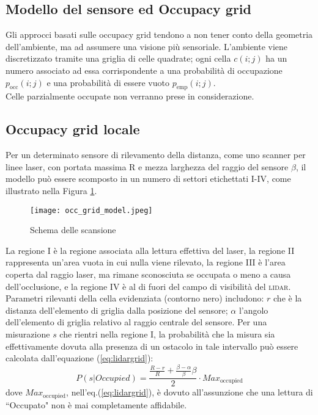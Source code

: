 \subsection{Modello del sensore ed Occupacy grid}

Gli approcci basati sulle occupacy grid tendono a non tener conto della geometria 
dell'ambiente, ma ad assumere una visione più sensoriale.
L'ambiente viene discretizzato tramite una griglia di celle quadrate; ogni 
cella $c(i; j)$ ha un numero associato ad essa corrispondente a una probabilità 
di occupazione $p_{\text{occ}}(i; j)$ e una probabilità di essere 
vuoto $p_{\text{emp}}(i;j)$.\\
Celle parzialmente occupate non verranno prese in considerazione.

\subsection{Occupacy grid locale}
Per un determinato sensore di rilevamento della distanza, come uno scanner per 
linee laser, con portata massima R e mezza larghezza del raggio del sensore
$\beta$, il modello può essere scomposto in un numero di settori etichettati 
I-IV\cite{ardhaoui2011implementation}, come illustrato nella Figura \ref{fig:scan scheme}.
%
\begin{figure}[htb]
  \texttt{[image: occ\_grid\_model.jpeg]}
  \caption{Schema delle scansione}
  \label{fig:scan scheme}
\end{figure}

\noindent La regione I è la regione associata alla lettura effettiva del laser, la
regione II rappresenta un'area vuota in cui nulla viene rilevato, la regione III
è l'area coperta dal raggio laser, ma rimane sconosciuta se occupata o meno a
causa dell'occlusione, e la regione IV è al di fuori del campo di visibilità del \textsc{lidar}.
Parametri rilevanti della cella evidenziata (contorno nero) includono: $r$ che 
è la distanza dell'elemento di griglia dalla posizione del sensore; 
$\alpha$ l'angolo dell'elemento di griglia relativo al raggio centrale del sensore.
Per una misurazione $s$ che rientri nella regione I, la probabilità che la
misura sia effettivamente dovuta alla presenza di  un ostacolo in tale 
intervallo può essere calcolata dall'equazione (\ref{eq:lidargrid}):
%
\begin{equation}	
\label{eq:lidargrid}
P(s|Occupied) = \frac{\frac{R-r}{R} + \frac{ \beta- \alpha}{\beta} \beta}{2} 
\cdot Max_{\text{occupied}}
\end{equation}
%
dove $Max_{\text{occupied}}$, nell'eq.(\ref{eq:lidargrid}), è dovuto all'assunzione 
che una lettura di ``Occupato" non è mai completamente affidabile.
%
